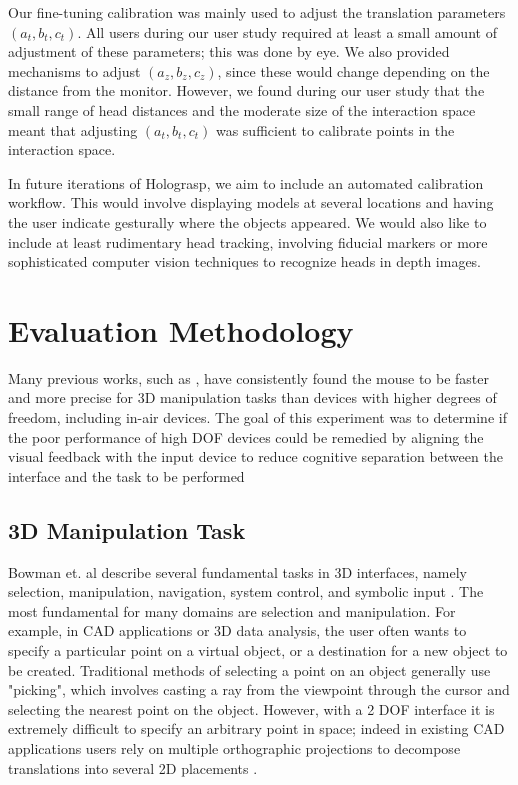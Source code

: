 \documentclass[pageno]{jpaper}
\begin{document}
Our fine-tuning calibration was mainly used to adjust the translation parameters $(a_t, b_t, c_t)$. All users during our user study required at least
a small amount of adjustment of these parameters; this was done by eye. We also provided mechanisms to adjust
$(a_z, b_z, c_z)$, since these would change depending on the distance from the monitor. However, we found during our user study that the small range of
head distances and the moderate size of the interaction space meant that adjusting $(a_t, b _t, c_t)$ was sufficient to calibrate points in the
interaction space.

In future iterations of Holograsp, we aim to include an automated calibration workflow. This would involve displaying models at several locations and
having the user indicate gesturally where the objects appeared. We would also like to include at least rudimentary head tracking, involving fiducial
markers or more sophisticated computer vision techniques to recognize heads in depth images.

\newpage
\section{Evaluation Methodology}
\label{sec:methodology}
Many previous works, such as \cite{study1,mattheiss2011navigating,study2}, have consistently found the
mouse to be faster and more precise for 3D manipulation
tasks than devices with higher degrees of freedom, including in-air devices.
The goal of this experiment was to determine if the poor performance of high DOF devices could
be remedied by aligning the visual feedback with the input device to reduce cognitive separation between the interface and the task to be performed
\subsection{3D Manipulation Task}
Bowman et. al describe several fundamental tasks in 3D interfaces, namely selection,
manipulation, navigation, system control, and symbolic input \cite{3dui}. The most fundamental
for many domains are selection and manipulation. For example, in CAD applications or 3D data
analysis, the user often wants to specify a particular point on a virtual object, or a
destination for a new object to be created. Traditional methods of selecting a point on an
object generally use "picking", which involves casting a ray from the viewpoint through the
cursor and selecting the nearest point on the object\cite{study1}. However, with a 2 DOF
interface it is extremely difficult to specify an arbitrary point in space; indeed in existing
CAD applications users rely on multiple orthographic projections to decompose translations into
several 2D placements \cite{study2}.
\end{document}

